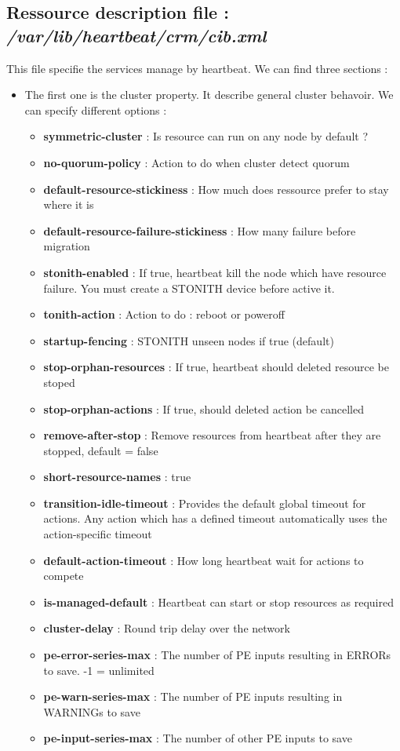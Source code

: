 \documentclass[a4paper,10pt]{report}
\begin{document}
\subsection{Ressource description file : \textit{/var/lib/heartbeat/crm/cib.xml}}
This file specifie the services manage by heartbeat. We can find three sections :
\begin{itemize}
\item The first one is the cluster property. It describe general cluster behavoir. We can specify different options :

\begin{itemize}
\item \textbf{symmetric-cluster} : Is resource can run on any node by default ?
\item \textbf{no-quorum-policy} : Action to do when cluster detect quorum
\item \textbf{default-resource-stickiness} : How much does ressource prefer to stay where it is
\item \textbf{default-resource-failure-stickiness} : How many failure before migration
\item \textbf{stonith-enabled} : If true, heartbeat kill the node which have resource failure. You must create a STONITH device before active it.
\item \textbf{tonith-action} : Action to do : reboot or poweroff
\item \textbf{startup-fencing} : STONITH unseen nodes if true (default)
\item \textbf{stop-orphan-resources} : If true, heartbeat should deleted resource be stoped
\item \textbf{stop-orphan-actions} : If true, should deleted action be cancelled
\item \textbf{remove-after-stop} : Remove resources from heartbeat after they are stopped, default = false
\item \textbf{short-resource-names} : true
\item \textbf{transition-idle-timeout} : Provides the default global timeout for actions. Any action which has a defined timeout automatically
uses the action-specific timeout
\item \textbf{default-action-timeout} : How long heartbeat wait for actions to compete
\item \textbf{is-managed-default} : Heartbeat can start or stop resources as required
\item \textbf{cluster-delay} : Round trip delay over the network
\item \textbf{pe-error-series-max} : The number of PE inputs resulting in ERRORs to save. -1 = unlimited
\item \textbf{pe-warn-series-max} : The number of PE inputs resulting in WARNINGs to save
\item \textbf{pe-input-series-max} : The number of other PE inputs to save
\end{itemize}


\end{itemize}
\end{document}
